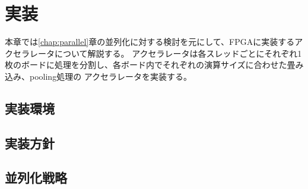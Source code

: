 \chapter{実装}
{
\label{chap:implement}
本章では\ref{chap:parallel}章の並列化に対する検討を元にして、FPGAに実装するアクセラレータについて解説する。
アクセラレータは各スレッドごとにそれぞれ1枚のボードに処理を分割し、各ボード内でそれぞれの演算サイズに合わせた畳み込み、pooling処理の
アクセラレータを実装する。
\section{実装環境}
\label{sec:impl_env}

\section{実装方針}
\label{sec:principle}

\section{並列化戦略}
\label{sec:strategy}
}